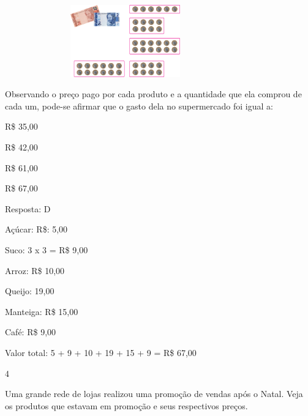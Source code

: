 \begin{multicols}{2}
{%

\includegraphics[width=4.10036in,height=1.22511in]{media/image74.png}

Observando o preço pago por cada produto e a quantidade que ela comprou de cada um, pode-se afirmar que o gasto dela no supermercado foi igual a:

\begin{escolha}

\item
  R\$ 35,00
\item
  R\$ 42,00
\item
  R\$ 61,00
\item
  R\$ 67,00
\end{escolha}

Resposta: D

Açúcar: R\$: 5,00

Suco: 3 x 3 = R\$ 9,00

Arroz: R\$ 10,00

Queijo: 19,00

Manteiga: R\$ 15,00

Café: R\$ 9,00

Valor total: 5 + 9 + 10 + 19 + 15 + 9 = R\$ 67,00

\num{4}

Uma grande rede de lojas realizou uma promoção de vendas após o Natal.
Veja os produtos que estavam em promoção e seus respectivos preços.





}
\end{multicols}
